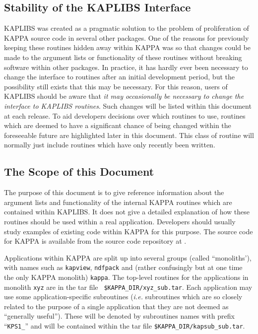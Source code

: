 \subsection{Stability of the KAPLIBS Interface}
KAPLIBS was created as a pragmatic solution to the problem of
proliferation of KAPPA source code in several other packages. One of the
reasons for previously keeping these routines hidden away within KAPPA was
so that changes could be made to the argument lists or functionality
of these routines without breaking software within other packages. In
practice, it has hardly ever been necessary to change the interface to
routines after an initial development period, but the possibility still
exists that this may be necessary. For this reason, users of KAPLIBS
should be aware that \emph{it may occasionally be necessary to change the
interface to KAPLIBS routines}. Such changes will be listed within
this document at each release. To aid developers decisions over which
routines to use, routines which are deemed to have a significant chance
of being changed within the foreseeable future are highlighted later in
this document. This class of routine will normally just include routines
which have only recently been written.

\subsection{The Scope of this Document}
The purpose of this document is to give reference information about the
argument lists and functionality of the internal KAPPA routines which are
contained within KAPLIBS. It does not give a detailed explanation of how
these routines should be used within a real application. Developers
should usually study examples of existing code within KAPPA for this
purpose. The source code for KAPPA is available from the source code
repository at .

Applications within KAPPA are split up into several groups (called
``monoliths'), with names such as {\tt kapview}, {\tt ndfpack} and
(rather confusingly but at one time the only KAPPA monolith)
{\tt kappa}. The top-level routines for the
applications in monolith {\tt xyz} are in the tar file {\tt
\$KAPPA\_DIR/xyz\_sub.tar}. Each application may use some
application-specific subroutines (\emph{i.e.} subroutines which are so
closely related to the purpose of a single application that they are not
deemed as ``generally useful''). These will be denoted by subroutines
names with prefix ``{\tt KPS1\_}'' and will be contained within the tar
file {\tt \$KAPPA\_DIR/kapsub\_sub.tar}.

